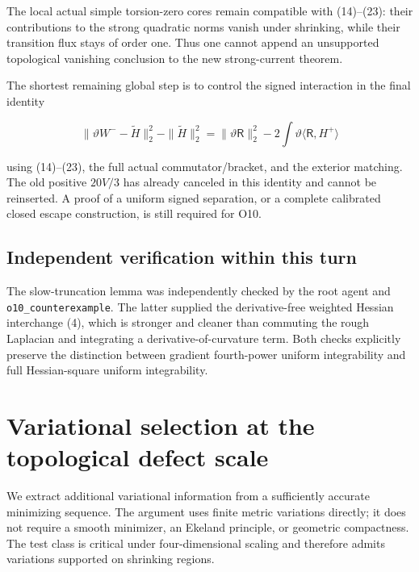 \documentclass[11pt]{article}
\begin{document}
The local actual simple torsion-zero cores remain compatible with
(14)--(23): their contributions to the strong quadratic norms vanish
under shrinking, while their transition flux stays of order one. Thus
one cannot append an unsupported topological vanishing conclusion to the
new strong-current theorem.

The shortest remaining global step is to control the signed interaction
in the final identity

\[
 \|\vartheta W^--\widetilde H\|_2^2-
 \|\widetilde H\|_2^2
 =\|\vartheta\mathsf R\|_2^2-
 2\int\vartheta\langle\mathsf R,H^+\rangle
\]

using (14)--(23), the full actual commutator/bracket, and the exterior
matching. The old positive \(20V/3\) has already canceled in this
identity and cannot be reinserted. A proof of a uniform signed
separation, or a complete calibrated closed escape construction, is
still required for O10.

\hypertarget{independent-verification-within-this-turn}{%
\subsection{Independent verification within this
turn}\label{independent-verification-within-this-turn}}

The slow-truncation lemma was independently checked by the root agent
and \texttt{o10\_counterexample}. The latter supplied the
derivative-free weighted Hessian interchange (4), which is stronger and
cleaner than commuting the rough Laplacian and integrating a
derivative-of-curvature term. Both checks explicitly preserve the
distinction between gradient fourth-power uniform integrability and full
Hessian-square uniform integrability.

\clearpage

\section{Variational selection at the topological defect scale}
\label{sec:o11-variational-selection-20260929}

We extract additional variational information from a sufficiently accurate
minimizing sequence. The argument uses finite metric variations directly;
it does not require a smooth minimizer, an Ekeland principle, or geometric
compactness. The test class is critical under four-dimensional scaling and
therefore admits variations supported on shrinking regions.
\end{document}
